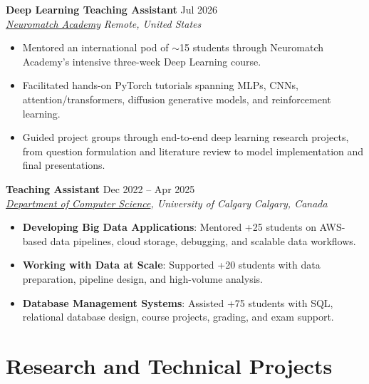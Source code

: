 \documentclass[a4paper,10pt]{article}
\newcommand{\resumeSubheading}[4]{
    \textbf{#1} \hfill #2 \\
    \textit{#3} \hfill \textit{#4}
}
\begin{document}
\resumeSubheading
{Deep Learning Teaching Assistant}
{Jul 2026}
{\href{https://neuromatch.io/}{Neuromatch Academy}}
{Remote, United States}
\begin{itemize}[leftmargin=0.25in]
    \item Mentored an international pod of $\sim$15 students through Neuromatch Academy's intensive three-week Deep Learning course.
    \item Facilitated hands-on PyTorch tutorials spanning MLPs, CNNs, attention/transformers, diffusion generative models, and reinforcement learning.
    \item Guided project groups through end-to-end deep learning research projects, from question formulation and literature review to model implementation and final presentations.
\end{itemize}

\resumeSubheading
{Teaching Assistant}
{Dec 2022 -- Apr 2025}
{\href{https://science.ucalgary.ca/computer-science} {Department of Computer Science}, University of Calgary}
{Calgary, Canada}
\begin{itemize}[leftmargin=0.25in]
    \item \textbf{Developing Big Data Applications}: Mentored +25 students on AWS-based data pipelines, cloud storage, debugging, and scalable data workflows.
    \item \textbf{Working with Data at Scale}: Supported +20 students with data preparation, pipeline design, and high-volume analysis.
    \item \textbf{Database Management Systems}: Assisted +75 students with SQL, relational database design, course projects, grading, and exam support.
\end{itemize}


\section*{Research and Technical Projects}
\end{document}
